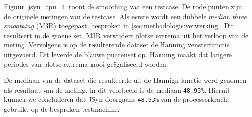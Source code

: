 Figuur \ref{jsyn_cpu_4} toont de smoothing van een testcase. De rode punten zijn de originele metingen van de testcase. Als eerste wordt een dubbele \textit{median three smoothing} (M3R) toegepast; besproken in \ref{sec:methodologie:verwerking}. Dit resulteert in de groene set. M3R verwijdert plotse extrema uit het verloop van de meting. Vervolgens is op de resulterende dataset de Hanning vensterfunctie uitgevoerd. Dit leverde de blauwe puntenset op. Hanning maakt dat langere periodes van plotse extrema mooi geëgaliseerd worden.

De mediaan van de dataset die resulteerde uit de Hannign functie werd genomen als resultaat van de meting. In dit voorbeeld is de mediaan \verb+48.93%+. Hieruit kunnen we concluderen dat JSyn doorgaans \verb+48.93%+ van de processorkracht gebruikt op de besproken testmachine.

